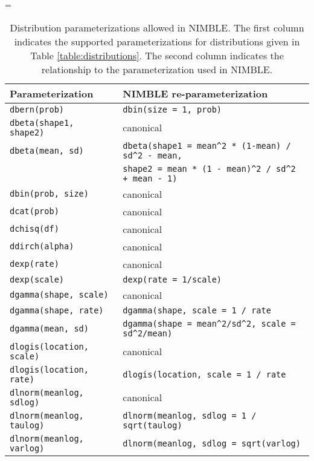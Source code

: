   \begin{center}
    \LTcapwidth=\textwidth
    \begin{longtable}{ll}

  \caption{Distribution parameterizations allowed in NIMBLE. The first
    column indicates the supported parameterizations for
    distributions given in Table \ref{table:distributions}. The second column indicates the
    relationship to the  parameterization used in
    NIMBLE. } \label{table:distributions-alternates}\\
      \hline
      Parameterization & NIMBLE re-parameterization \\
      \hline \hline
\endhead
   \texttt{dbern(prob)} & \texttt{dbin(size = 1, prob)} \\
      \texttt{dbeta(shape1, shape2)} & canonical \\
      \texttt{dbeta(mean, sd)} & \verb|dbeta(shape1 = mean^2 * (1-mean) / sd^2 - mean,| \\
      & \verb|shape2 = mean * (1 - mean)^2 / sd^2 + mean - 1)| \\
   \texttt{dbin(prob, size)} & canonical \\
         \texttt{dcat(prob)} & canonical \\
         \texttt{dchisq(df)} & canonical \\
         \texttt{ddirch(alpha)} & canonical \\
      \texttt{dexp(rate)} & canonical \\
       \texttt{dexp(scale)} & \texttt{dexp(rate = 1/scale)} \\
     \texttt{dgamma(shape, scale)} & canonical \\
      \texttt{dgamma(shape, rate)} & \verb|dgamma(shape, scale = 1 / rate| \\
      \texttt{dgamma(mean, sd)} & \verb|dgamma(shape = mean^2/sd^2, scale = sd^2/mean)| \\
     \texttt{dlogis(location, scale)} & canonical \\
     \texttt{dlogis(location, rate)} & \verb|dlogis(location, scale = 1 / rate| \\
     \texttt{dlnorm(meanlog, sdlog)} & canonical \\
     \texttt{dlnorm(meanlog, taulog)} & \verb|dlnorm(meanlog, sdlog = 1 / sqrt(taulog)| \\
     \texttt{dlnorm(meanlog, varlog)} & \verb|dlnorm(meanlog, sdlog = sqrt(varlog)| \\

\end{longtable}
\end{center}
